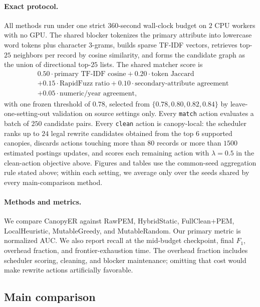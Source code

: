 \documentclass{article}
\newcommand{\method}{CanopyER}
\newcommand{\nauc}{normalized AUC}
\newcommand{\matcha}{\texttt{match}}
\newcommand{\cleana}{\texttt{clean}}
\begin{document}
\paragraph{Exact protocol.}
All methods run under one strict $360$-second wall-clock budget on $2$ CPU workers with no GPU. The shared blocker tokenizes the primary attribute into lowercase word tokens plus character $3$-grams, builds sparse TF-IDF vectors, retrieves top-$25$ neighbors per record by cosine similarity, and forms the candidate graph as the union of directional top-$25$ lists. The shared matcher score is
\[
\begin{aligned}
&0.50 \cdot \text{primary TF-IDF cosine} + 0.20 \cdot \text{token Jaccard} \\
&+ 0.15 \cdot \text{RapidFuzz ratio} + 0.10 \cdot \text{secondary-attribute agreement} \\
&+ 0.05 \cdot \text{numeric/year agreement},
\end{aligned}
\]
with one frozen threshold of $0.78$, selected from $\{0.78, 0.80, 0.82, 0.84\}$ by leave-one-setting-out validation on source settings only. Every \matcha{} action evaluates a batch of $250$ candidate pairs. Every \cleana{} action is canopy-local: the scheduler ranks up to $24$ legal rewrite candidates obtained from the top $6$ supported canopies, discards actions touching more than $80$ records or more than $1500$ estimated postings updates, and scores each remaining action with $\lambda=0.5$ in the clean-action objective above. Figures and tables use the common-seed aggregation rule stated above; within each setting, we average only over the seeds shared by every main-comparison method.

\paragraph{Methods and metrics.}
We compare \method{} against RawPEM, HybridStatic, FullClean+PEM, LocalHeuristic, MutableGreedy, and MutableRandom. Our primary metric is \nauc{}. We also report recall at the mid-budget checkpoint, final $F_1$, overhead fraction, and frontier-exhaustion time. The overhead fraction includes scheduler scoring, cleaning, and blocker maintenance; omitting that cost would make rewrite actions artificially favorable.

\subsection{Main comparison}
\end{document}

